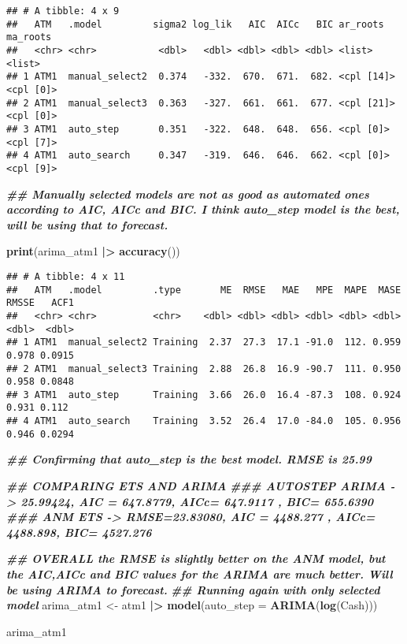\documentclass[
]{article}
\newenvironment{Shaded}{\begin{snugshade}}{\end{snugshade}}
\newcommand{\AttributeTok}[1]{\textcolor[rgb]{0.13,0.29,0.53}{#1}}
\newcommand{\DocumentationTok}[1]{\textcolor[rgb]{0.56,0.35,0.01}{\textbf{\textit{#1}}}}
\newcommand{\FunctionTok}[1]{\textcolor[rgb]{0.13,0.29,0.53}{\textbf{#1}}}
\newcommand{\NormalTok}[1]{#1}
\newcommand{\OtherTok}[1]{\textcolor[rgb]{0.56,0.35,0.01}{#1}}
\newcommand{\SpecialCharTok}[1]{\textcolor[rgb]{0.81,0.36,0.00}{\textbf{#1}}}
\begin{document}
\begin{verbatim}
## # A tibble: 4 x 9
##   ATM   .model         sigma2 log_lik   AIC  AICc   BIC ar_roots   ma_roots 
##   <chr> <chr>           <dbl>   <dbl> <dbl> <dbl> <dbl> <list>     <list>   
## 1 ATM1  manual_select2  0.374   -332.  670.  671.  682. <cpl [14]> <cpl [0]>
## 2 ATM1  manual_select3  0.363   -327.  661.  661.  677. <cpl [21]> <cpl [0]>
## 3 ATM1  auto_step       0.351   -322.  648.  648.  656. <cpl [0]>  <cpl [7]>
## 4 ATM1  auto_search     0.347   -319.  646.  646.  662. <cpl [0]>  <cpl [9]>
\end{verbatim}

\begin{Shaded}
\begin{Highlighting}[]
\DocumentationTok{\#\# Manually selected models are not as good as automated ones according to AIC, AICc and BIC. I think auto\_step model is the best, will be using that to forecast. }

\FunctionTok{print}\NormalTok{(arima\_atm1 }\SpecialCharTok{|\textgreater{}} \FunctionTok{accuracy}\NormalTok{())}
\end{Highlighting}
\end{Shaded}

\begin{verbatim}
## # A tibble: 4 x 11
##   ATM   .model         .type       ME  RMSE   MAE   MPE  MAPE  MASE RMSSE   ACF1
##   <chr> <chr>          <chr>    <dbl> <dbl> <dbl> <dbl> <dbl> <dbl> <dbl>  <dbl>
## 1 ATM1  manual_select2 Training  2.37  27.3  17.1 -91.0  112. 0.959 0.978 0.0915
## 2 ATM1  manual_select3 Training  2.88  26.8  16.9 -90.7  111. 0.950 0.958 0.0848
## 3 ATM1  auto_step      Training  3.66  26.0  16.4 -87.3  108. 0.924 0.931 0.112 
## 4 ATM1  auto_search    Training  3.52  26.4  17.0 -84.0  105. 0.956 0.946 0.0294
\end{verbatim}

\begin{Shaded}
\begin{Highlighting}[]
\DocumentationTok{\#\# Confirming that auto\_step is the best model. RMSE is 25.99}


\DocumentationTok{\#\# COMPARING ETS AND ARIMA}
\DocumentationTok{\#\#\# AUTOSTEP ARIMA {-}\textgreater{} 25.99424, AIC = 647.8779, AICc=   647.9117 , BIC= 655.6390}
\DocumentationTok{\#\#\# ANM ETS {-}\textgreater{} RMSE=23.83080, AIC = 4488.277    , AICc= 4488.898, BIC=  4527.276    }
  

\DocumentationTok{\#\# OVERALL the RMSE is slightly better on the ANM model, but the AIC,AICc and BIC values for the ARIMA are much better. Will be using ARIMA to forecast. }
\DocumentationTok{\#\# Running again with only selected model }
\NormalTok{arima\_atm1 }\OtherTok{\textless{}{-}}\NormalTok{ atm1 }\SpecialCharTok{|\textgreater{}} 
  \FunctionTok{model}\NormalTok{(}\AttributeTok{auto\_step =} \FunctionTok{ARIMA}\NormalTok{(}\FunctionTok{log}\NormalTok{(Cash))) }

\NormalTok{arima\_atm1}
\end{Highlighting}
\end{Shaded}
\end{document}
